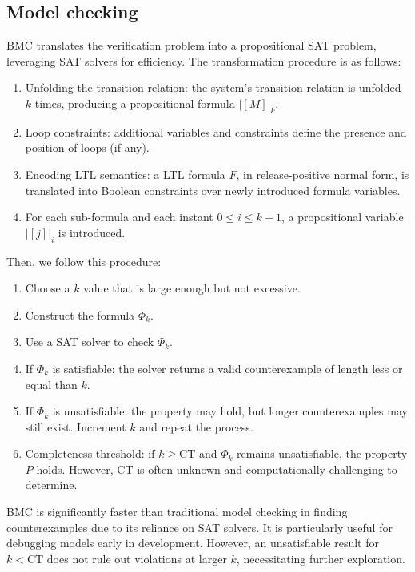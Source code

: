 \subsection{Model checking}
BMC translates the verification problem into a propositional SAT problem, leveraging SAT solvers for efficiency.
The transformation procedure is as follows: 
\begin{enumerate}
    \item Unfolding the transition relation: the system's transition relation is unfolded $k$ times, producing a propositional formula ${\left\lvert [M]\right\rvert }_k$. 
    \item Loop constraints: additional variables and constraints define the presence and position of loops (if any). 
    \item Encoding LTL semantics: a LTL formula $F$, in release-positive normal form, is translated into Boolean constraints over newly introduced formula variables.
    \item For each sub-formula and each instant $0\leq i \leq k+1$, a propositional variable ${\left\lvert [j]\right\rvert }_i$ is introduced.
\end{enumerate}
\noindent Then, we follow this procedure: 
\begin{enumerate}
    \item Choose a $k$ value that is large enough but not excessive.
    \item Construct the formula $\Phi_k$.
    \item Use a SAT solver to check $\Phi_k$. 
    \item If $\Phi_k$ is satisfiable: the solver returns a valid counterexample of length less or equal than $k$.
    \item If $\Phi_k$ is unsatisfiable: the property may hold, but longer counterexamples may still exist. 
        Increment $k$ and repeat the process.
    \item Completeness threshold: if $k\geq\text{CT}$ and $\Phi_k$ remains unsatisfiable, the property $P$ holds. 
        However, $\text{CT}$ is often unknown and computationally challenging to determine.
\end{enumerate}
\noindent BMC is significantly faster than traditional model checking in finding counterexamples due to its reliance on SAT solvers.
It is particularly useful for debugging models early in development.
However, an unsatisfiable result for $k<\text{CT}$ does not rule out violations at larger $k$, necessitating further exploration.